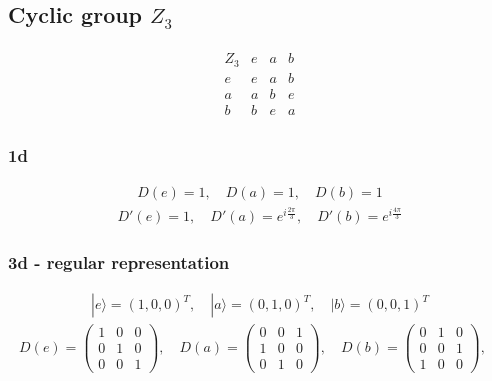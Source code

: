 \documentclass[10pt,a4paper]{article}
\theoremstyle{definition}
\begin{document}
\subsection{Cyclic group $Z_3$}
\begin{align}
\begin{array}{c||ccc}
Z_3 & e & a & b \\ \hline\hline
e & e & a & b \\
a & a & b & e \\
b & b & e & a
\end{array}
\end{align}
\subsubsection{1d}
\begin{align}
D(e)=1,\quad D(a)=1,\quad D(b)=1
\end{align}
\begin{align}
D'(e)=1,\quad D'(a)=e^{i\frac{2\pi}{3}},\quad D'(b)=e^{i\frac{4\pi}{3}}
\end{align}


\subsubsection{3d - regular representation}
\begin{align}
|e\rangle=(1,0,0)^T,\quad |a\rangle=(0,1,0)^T,\quad |b\rangle=(0,0,1)^T
\end{align}
\begin{align}
D(e)=\left(\begin{array}{ccc}
1 & 0 & 0 \\
0 & 1 & 0 \\
0 & 0 & 1 
\end{array}
\right),\quad
D(a)=\left(\begin{array}{ccc}
0 & 0 & 1 \\
1 & 0 & 0 \\
0 & 1 & 0 
\end{array}
\right),\quad
D(b)=\left(\begin{array}{ccc}
0 & 1 & 0 \\
0 & 0 & 1 \\
1 & 0 & 0 
\end{array}
\right),\quad
\end{align}
\end{document}
